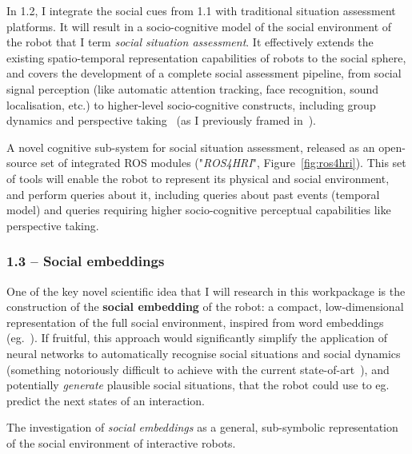In 1.2, I integrate the social
cues from 1.1 with traditional situation assessment platforms. It will
result in a socio-cognitive model of the social environment of the robot that I
term \emph{social situation assessment}. It effectively extends the
existing spatio-temporal representation capabilities of robots to the social
sphere, and covers the development of a complete social assessment pipeline,
from social signal perception (like automatic attention tracking, face
recognition, sound localisation, etc.) to higher-level socio-cognitive
constructs, including group dynamics and perspective
taking~\parencite{flavell1992perspectives} (as I previously framed
in~\parencite{lemaignan2015mutual, dillenbourg2016symmetry}).

\begin{outcome}{1.2}
A novel cognitive sub-system for social
    situation assessment, released as an open-source set of integrated ROS
    modules ("\emph{ROS4HRI}", Figure~\ref{fig:ros4hri}). This set of tools will enable the robot to
    represent its physical and social environment, and perform queries about it,
    including queries about past events (temporal model) and queries requiring
    higher socio-cognitive perceptual capabilities like perspective taking.
\end{outcome}


\subsubsection{1.3 -- Social embeddings}

One of the key novel scientific idea that I will research in this workpackage is
the construction of the \textbf{social embedding} of the robot:
a compact, low-dimensional representation of the full social environment,
inspired from word embeddings (eg.~\parencite{mikolov2013distributed}). If fruitful,
this approach would significantly simplify the application of neural networks to
automatically recognise social situations and social dynamics (something notoriously difficult
to achieve with the current state-of-art~\parencite{bartlett2019what}), and
potentially \emph{generate} plausible social situations, that the robot could
use to eg. predict the next states of an interaction.

\begin{outcome}{1.3}
The investigation of \emph{social
    embeddings} as a general, sub-symbolic representation of the social
    environment of interactive robots.
\end{outcome}

